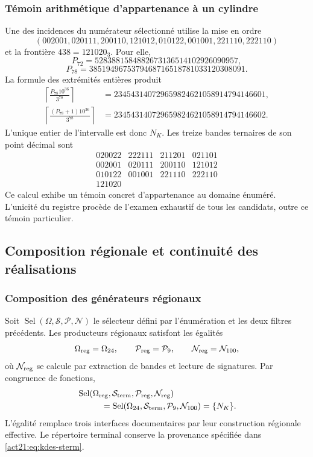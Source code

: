 \subsubsection{Témoin arithmétique d'appartenance à un cylindre}

Une des incidences du numérateur sélectionné utilise la mise en ordre
\[
 (002001,020111,200110,121012,010122,001001,221110,222110)
\]
et la frontière $438=121020_3$. Pour elle,
\[
 P_{72}=5283881584882673136514102926090957,
\]
\[
 P_{78}=3851949675379468716518781033120308091.
\]
La formule des extrémités entières produit
\begin{align*}
 \left\lceil\frac{P_{78}10^{36}}{3^{78}}\right\rceil
 &=234543140729659824621058914794146601,\\
 \left\lceil\frac{(P_{78}+1)10^{36}}{3^{78}}\right\rceil
 &=234543140729659824621058914794146602.
\end{align*}
L'unique entier de l'intervalle est donc $N_K$. Les treize bandes ternaires de son point décimal sont
\[
 \begin{array}{rrrr}
 020022&222111&211201&021101\\
 002001&020111&200110&121012\\
 010122&001001&221110&222110\\
 121020&&&
 \end{array}
\]
Ce calcul exhibe un témoin concret d'appartenance au domaine énuméré. L'unicité du registre procède de l'examen exhaustif de tous les candidats, outre ce témoin particulier.

\subsection{Composition régionale et continuité des réalisations}

\subsubsection{Composition des générateurs régionaux}

Soit $\operatorname{Sel}(\Omega,\mathcal S,\mathcal P,\mathcal N)$ le
sélecteur défini par l'énumération et les deux filtres précédents.
Les producteurs régionaux satisfont les égalités
\[
 \Omega_{\rm reg}=\Omega_{24},\qquad
 \mathcal P_{\rm reg}=\mathcal P_9,\qquad
 \mathcal N_{\rm reg}=\mathcal N_{100},
\]
où $\mathcal N_{\rm reg}$ se calcule par extraction de bandes et
lecture de signatures. Par congruence de fonctions,
\begin{equation}
 \begin{split}
 &\operatorname{Sel}(\Omega_{\rm reg},\mathcal S_{\rm term},
                    \mathcal P_{\rm reg},\mathcal N_{\rm reg})\\
 &\hspace{10mm}=
 \operatorname{Sel}(\Omega_{24},\mathcal S_{\rm term},
                    \mathcal P_9,\mathcal N_{100})=\{N_K\}.
 \end{split}
 \label{act21:eq:kdes-composicion}
\end{equation}
L'égalité remplace trois interfaces documentaires par leur construction
régionale effective. Le répertoire terminal conserve la provenance
spécifiée dans \eqref{act21:eq:kdes-sterm}.

